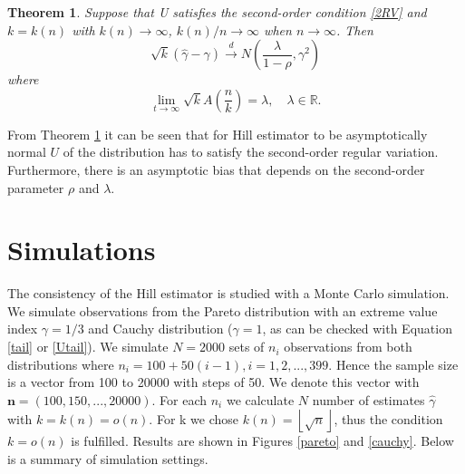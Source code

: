 \documentclass[english,12pt,a4paper,pdftex,sci,utf8]{aaltothesis} %
\newtheorem{theorem}{Theorem}[section]
\begin{document}
\begin{theorem}
Suppose that U satisfies the second-order condition \ref{2RV} and $k=k(n)$ with $k(n)\rightarrow \infty$, $k(n)/n \rightarrow \infty$ when $n\rightarrow \infty$. Then
\begin{equation*}
\sqrt{k}(\hat{\gamma} - \gamma) \xrightarrow{d} N \left( \frac{\lambda}{1- \rho}, \gamma^2 \right)
\end{equation*}
where
\begin{equation*}
\lim_{t \rightarrow \infty} \sqrt{k}A \left(\frac{n}{k} \right) = \lambda, \quad \lambda \in \mathbb{R}.
\end{equation*}
\label{normality}
\end{theorem}
From Theorem \ref{normality} it can be seen that for Hill estimator to be asymptotically normal $U$ of the distribution has to satisfy the second-order regular variation. Furthermore, there is an asymptotic bias that depends on the second-order parameter $\rho$ and $\lambda$.



\clearpage
\section{Simulations}
\label{simut}

The consistency of the Hill estimator is studied with a Monte Carlo simulation. We simulate observations from the Pareto distribution with an extreme value index $\gamma=1/3$ and Cauchy distribution ($\gamma=1$, as can be checked with Equation \eqref{tail} or \eqref{Utail}). We simulate $N=2000$ sets of $n_i$ observations from both distributions where $n_i=100+50(i-1), i=1,2,...,399$. Hence the sample size is a vector from 100 to 20000 with steps of 50. We denote this vector with $\textbf{n}=(100,150,...,20000)$. For each $n_i$ we calculate $N$ number of estimates $\hat{\gamma}$ with $k=k(n)=o(n)$. For k we chose $k(n)=\left \lfloor \sqrt{n} \right \rfloor$, thus the condition $k=o(n)$ is fulfilled. Results are shown in Figures \ref{pareto} and \ref{cauchy}. Below is a summary of simulation settings.

\end{document}

